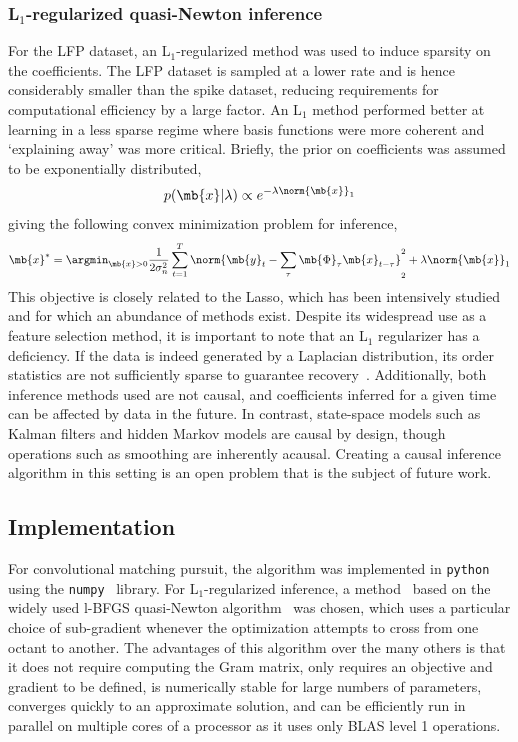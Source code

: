 \subsubsection{L$_1$-regularized quasi-Newton inference}
\label{sec:quasinewton}

For the LFP dataset, an L$_1$-regularized method was used to induce
sparsity on the coefficients. The LFP dataset is sampled at a lower
rate and is hence considerably smaller than the spike dataset,
reducing requirements for computational efficiency by a large
factor. An L$_1$ method performed better at learning in a less sparse
regime where basis functions were more coherent and `explaining away'
was more critical. Briefly, the prior on coefficients was assumed to be
exponentially distributed,
\begin{align*}
  p(\mb{x}|\lambda) \propto e^{-\lambda \norm{\mb{x}}_1}
\end{align*}
giving the following convex minimization problem for inference,
\begin{align*}
  \mb{x}^* = \argmin_{\mb{x}>0} \frac{1}{2 \sigma_n^2} \sum_{t=1}^T
  \norm{\mb{y}_t - \sum_\tau \mb{\Phi}_\tau \mb{x}_{t-\tau}}^2_2 +
  \lambda\norm{\mb{x}}_1
\end{align*}
This objective is closely related to the Lasso, which has been
intensively studied~\cite{tibshirani1996regression,chen1999atomic} and
for which an abundance of methods exist. Despite its widespread use as
a feature selection method, it is important to note that an L$_1$
regularizer has a deficiency. If the data is indeed generated by a
Laplacian distribution, its order statistics are not sufficiently
sparse to guarantee recovery~\cite{baraniuk2010low}. Additionally,
both inference methods used are not causal, and coefficients inferred
for a given time can be affected by data in the future. In contrast,
state-space models such as Kalman filters and hidden Markov models are
causal by design, though operations such as smoothing are inherently
acausal. Creating a causal inference algorithm in this setting is an
open problem that is the subject of future work.

\subsection{Implementation}

For convolutional matching pursuit, the algorithm was implemented in
\texttt{python} using the \texttt{numpy}~\cite{numpyscipy}
library. For L$_1$-regularized inference, a
method~\cite{andrew2007scalable} based on the widely used l-BFGS
quasi-Newton algorithm~\cite{Liu89} was chosen, which uses a
particular choice of sub-gradient whenever the optimization attempts
to cross from one octant to another. The advantages of this algorithm
over the many others is that it does not require computing the Gram
matrix, only requires an objective and gradient to be defined, is
numerically stable for large numbers of parameters, converges quickly
to an approximate solution, and can be efficiently run in parallel on
multiple cores of a processor as it uses only BLAS level 1 operations.

